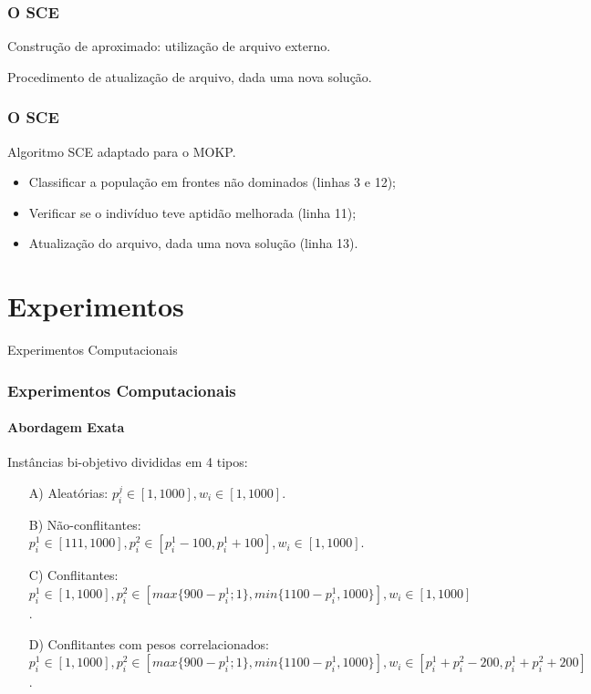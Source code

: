 \documentclass[10pt,xcolor=table,fleqn]{beamer}
\newcommand{\mytitle}[1]{
  \begin{center}
    \color{defblue}
    { \LARGE #1 }
  \end{center}
}
\begin{document}
\begin{frame}
	\frametitle{O SCE}
  Construção de \paretoset{} aproximado: utilização de arquivo externo.
  \vfill
  \begin{algorithm}[H]
    \footnotesize
    
    \caption{Procedimento de atualização de arquivo, dada uma nova solução.}
    \label{alg:archupdate}
  \end{algorithm}
\end{frame}

\begin{frame}
	\frametitle{O SCE}
  \begin{algorithm}[H]
    \scriptsize
    
    \caption{Algoritmo SCE adaptado para o MOKP.}
  \end{algorithm}
  \pause
  \begin{itemize}
    \small
    \item{Classificar a população em frontes não dominados (linhas 3 e 12);}
    \item{Verificar se o indivíduo teve aptidão melhorada (linha 11);}
    \item{Atualização do arquivo, dada uma nova solução (linha 13).}
  \end{itemize}
\end{frame}

\section{Experimentos}

\begin{frame}
	\mytitle{Experimentos Computacionais}
\end{frame}

\begin{frame}
	\frametitle{Experimentos Computacionais}
  \framesubtitle{Abordagem Exata}
  Instâncias bi-objetivo divididas em 4 tipos:
  \vspace{3mm}
  \begin{enumerate}
    \item[A)] Aleatórias: $
      p^j_i \in [1, 1000],
      w_i \in [1,1000]$.
    \vspace{3mm}
    \item[B)] Não-conflitantes: $
      p^1_i \in [111, 1000],
      p^2_i \in [p^1_i - 100, p^1_i + 100],
      w_i \in [1,1000]$.
    \vspace{3mm}
    \item[C)] Conflitantes: $
      p^1_i \in [1, 1000],
      p^2_i \in [max\{900-p^1_i;1\}, min\{1100-p^1_i, 1000\}],
      w_i \in [1,1000]$.
    \vspace{3mm}
    \item[D)] Conflitantes com pesos correlacionados: $
      p^1_i \in [1, 1000],
      p^2_i \in [max\{900-p^1_i;1\}, min\{1100-p^1_i, 1000\}],
      w_i \in [p^1_i+p^2_i-200, p^1_i+p^2_i+200]$.
  \end{enumerate}
\end{frame}
\end{document}
